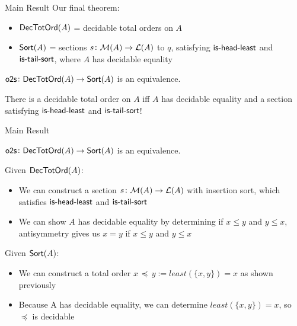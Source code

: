 \documentclass[9pt]{beamer}
\begin{document}
\begin{frame}{Main Result}
Our final theorem:
\begin{dblock}
    \begin{itemize}
        \item $\mathsf{DecTotOrd}(A)$ = decidable total orders on $A$

        \item $\mathsf{Sort}(A)$ = sections $s\colon \mathcal{M}(A) \to \mathcal{L}(A)$ to $q$,
            satisfying $\operatorname{\mathsf{is-head-least}}$ and $\operatorname{\mathsf{is-tail-sort}}$,
            where $A$ has decidable equality
    \end{itemize}
\end{dblock}

\begin{tblock}
    $\operatorname{\mathsf{o2s}}\colon \mathsf{DecTotOrd}(A) \to \mathsf{Sort}(A)$ is an equivalence.
\end{tblock}

There is a \alert{decidable total order} on $A$ iff
$A$ has \alert{decidable equality} and a \alert{section} satisfying $\operatorname{\mathsf{is-head-least}}$ and $\operatorname{\mathsf{is-tail-sort}}$!

\end{frame}
\begin{frame}{Main Result}

\begin{tblock}
    $\operatorname{\mathsf{o2s}}\colon \mathsf{DecTotOrd}(A) \to \mathsf{Sort}(A)$ is an equivalence.
\end{tblock}

Given $\mathsf{DecTotOrd}(A)$:
\begin{itemize}
    \item We can construct a section $s\colon \mathcal{M}(A) \to \mathcal{L}(A)$ with \alert{insertion sort},
    which satisfies $\operatorname{\mathsf{is-head-least}}$ and $\operatorname{\mathsf{is-tail-sort}}$
    \item We can show $A$ has \alert{decidable equality} by determining if $x \leq y$ and $y \leq x$,
    antisymmetry gives us $x = y$ if $x \leq y$ and $y \leq x$
\end{itemize}

Given $\mathsf{Sort}(A)$:
\begin{itemize}
    \item We can construct a \alert{total order} $x \, \preceq \, y := least(\{x, y\}) = x$ as shown previously
    \item Because A has decidable equality, we can determine $least(\{x, y\}) = x$, so $\preceq$ is \alert{decidable}
\end{itemize}

\end{frame}
\end{document}
